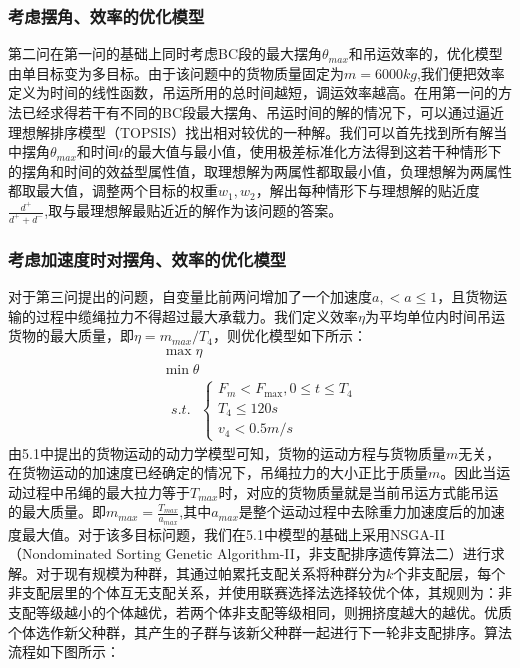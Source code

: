 \documentclass[withoutpreface,bwprint]{cumcmthesis} %
\begin{document}
\subsubsection{考虑摆角、效率的优化模型}

第二问在第一问的基础上同时考虑BC段的最大摆角$\theta_{max}$和吊运效率的，优化模型由单目标变为多目标。由于该问题中的货物质量固定为$m=6000kg$,我们便把效率定义为时间的线性函数，吊运所用的总时间越短，调运效率越高。在用第一问的方法已经求得若干有不同的BC段最大摆角、吊运时间的解的情况下，可以通过逼近理想解排序模型（TOPSIS）找出相对较优的一种解。我们可以首先找到所有解当中摆角$\theta_{max}$和时间$t$的最大值与最小值，使用极差标准化方法得到这若干种情形下的摆角和时间的效益型属性值，取理想解为两属性都取最小值，负理想解为两属性都取最大值，调整两个目标的权重$w_1,w_2$，解出每种情形下与理想解的贴近度$\frac{d^+}{d^++d^-}$,取与最理想解最贴近近的解作为该问题的答案。

\subsubsection{考虑加速度时对摆角、效率的优化模型}
对于第三问提出的问题，自变量比前两问增加了一个加速度$a,<a\leq1$，且货物运输的过程中缆绳拉力不得超过最大承载力。我们定义效率$\eta$为平均单位内时间吊运货物的最大质量，即$\eta=m_{max}/T_4$，则优化模型如下所示：
$$\begin{array}{l}
    \max \eta \\
    \min \theta \\
    \text { $s.t.$ }\left\{\begin{array}{c}
    F_{m}<F_{\max }, 0 \leqslant t \leqslant T_{4} \\
    T_{4} \leqslant 120 s \\
    v_{4}<0.5 m / s
    \end{array}\right.
\end{array}$$
由5.1中提出的货物运动的动力学模型可知，货物的运动方程与货物质量$m$无关，在货物运动的加速度已经确定的情况下，吊绳拉力的大小正比于质量$m$。因此当运动过程中吊绳的最大拉力等于$T_{max}$时，对应的货物质量就是当前吊运方式能吊运的最大质量。即$m_{max}=\frac{T_{max}}{a_{max}}$,其中$a_{max}$是整个运动过程中去除重力加速度后的加速度最大值。对于该多目标问题，我们在5.1中模型的基础上采用NSGA-II（Nondominated Sorting Genetic Algorithm-II，非支配排序遗传算法二）进行求解。对于现有规模为种群，其通过帕累托支配关系将种群分为$k$个非支配层，每个非支配层里的个体互无支配关系，并使用联赛选择法选择较优个体，其规则为：非支配等级越小的个体越优，若两个体非支配等级相同，则拥挤度越大的越优。优质个体选作新父种群，其产生的子群与该新父种群一起进行下一轮非支配排序。算法流程如下图所示：
\end{document}
